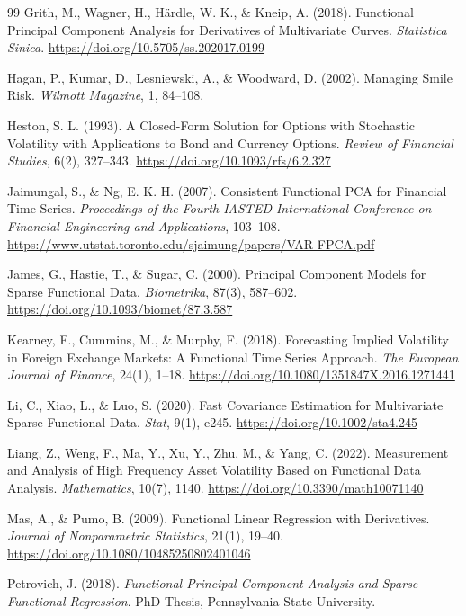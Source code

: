 \documentclass[12pt,a4paper]{article}
\begin{document}
\begin{thebibliography}{99}
Grith, M., Wagner, H., Härdle, W. K., \& Kneip, A. (2018). Functional Principal Component Analysis for Derivatives of Multivariate Curves. \emph{Statistica Sinica}. \url{https://doi.org/10.5705/ss.202017.0199}

Hagan, P., Kumar, D., Lesniewski, A., \& Woodward, D. (2002). Managing Smile Risk. \emph{Wilmott Magazine}, 1, 84--108.

Heston, S. L. (1993). A Closed-Form Solution for Options with Stochastic Volatility with Applications to Bond and Currency Options. \emph{Review of Financial Studies}, 6(2), 327--343. \url{https://doi.org/10.1093/rfs/6.2.327}

Jaimungal, S., \& Ng, E. K. H. (2007). Consistent Functional PCA for Financial Time-Series. \emph{Proceedings of the Fourth IASTED International Conference on Financial Engineering and Applications}, 103--108. \url{https://www.utstat.toronto.edu/sjaimung/papers/VAR-FPCA.pdf}

James, G., Hastie, T., \& Sugar, C. (2000). Principal Component Models for Sparse Functional Data. \emph{Biometrika}, 87(3), 587--602. \url{https://doi.org/10.1093/biomet/87.3.587}

Kearney, F., Cummins, M., \& Murphy, F. (2018). Forecasting Implied Volatility in Foreign Exchange Markets: A Functional Time Series Approach. \emph{The European Journal of Finance}, 24(1), 1--18. \url{https://doi.org/10.1080/1351847X.2016.1271441}

Li, C., Xiao, L., \& Luo, S. (2020). Fast Covariance Estimation for Multivariate Sparse Functional Data. \emph{Stat}, 9(1), e245. \url{https://doi.org/10.1002/sta4.245}

Liang, Z., Weng, F., Ma, Y., Xu, Y., Zhu, M., \& Yang, C. (2022). Measurement and Analysis of High Frequency Asset Volatility Based on Functional Data Analysis. \emph{Mathematics}, 10(7), 1140. \url{https://doi.org/10.3390/math10071140}

Mas, A., \& Pumo, B. (2009). Functional Linear Regression with Derivatives. \emph{Journal of Nonparametric Statistics}, 21(1), 19--40. \url{https://doi.org/10.1080/10485250802401046}

Petrovich, J. (2018). \emph{Functional Principal Component Analysis and Sparse Functional Regression}. PhD Thesis, Pennsylvania State University.


\end{thebibliography}
\end{document}
